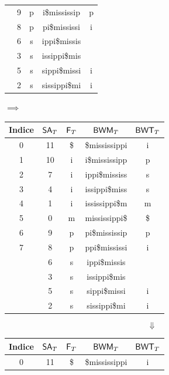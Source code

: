 \begin{esempio}
\begin{table}[H]
\begin{tabular}{c|c|c|c|c}
      {\color{nordred}{6}} & 9 & p & {\color{nordred}{p}}i\$mississip & p\\
      {\color{nordred}{7}} & 8 & p & {\color{nordred}{p}}pi\$mississi & i\\
      {\color{nordred}{8}} & 6 & s & {\color{nordred}{s}}ippi\$missis
      & {\color{nordgreen}{s}}\\
      {\color{nordred}{9}} & 3 & s & {\color{nordred}{s}}issippi\$mis
      & {\color{nordgreen}{s}}\\
      {\color{nordred}{10}} & 5 & s & {\color{nordred}{s}}sippi\$missi & i\\
      {\color{nordred}{11}} & 2 & s & {\color{nordred}{s}}sissippi\$mi & i\\
    \end{tabular}
    $\implies$
    \begin{tabular}{c|c|c|c|c} 
      \textbf{Indice} & $\mbox{\rm {\sf SA}}_T$ & $\mbox{\rm {\sf F}}_T$ & $\mbox{\rm {\sf BWM}}_T$
      & $\mbox{\rm {\sf BWT}}_T$\\  
      \hline
      0 & 11 & \$ & \$mississippi & i\\
      1 & 10 & i & i\$mississipp & p\\
      2 & 7 & i & ippi\$mississ & s\\
      3 & 4 & i & issippi\$miss & s\\
      4 & 1 & i & ississippi\$m & m\\
      5 & 0 & m & mississippi\$ & \$\\
      6 & 9 & p & pi\$mississip & p\\
      7 & 8 & p & ppi\$mississi & i\\
      {\color{nordred}{8}} & 6 & s & {\color{nordred}{s}}ippi\$missis
      & {\color{nordgreen}{s}}\\
      {\color{nordred}{9}} & 3 & s & {\color{nordred}{s}}issippi\$mis
      & {\color{nordgreen}{s}}\\
      {\color{nordred}{10}} & 5 & s & {\color{nordred}{s}}sippi\$missi & i\\
      {\color{nordred}{11}} & 2 & s & {\color{nordred}{s}}sissippi\$mi & i\\
    \end{tabular}
  \end{table}
  \[\Downarrow\]
  \begin{table}[H]
    \centering
    \scriptsize
    \begin{tabular}{c|c|c|c|c} 
    \textbf{Indice} & $\mbox{\rm {\sf SA}}_T$ & $\mbox{\rm {\sf F}}_T$ & $\mbox{\rm {\sf BWM}}_T$
      & $\mbox{\rm {\sf BWT}}_T$\\ 
      \hline
      0 & 11 & \$ & \$mississippi & i\\

\end{tabular}
\end{table}
\end{esempio}
